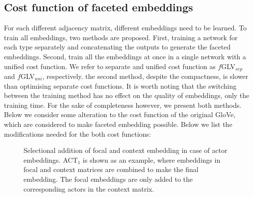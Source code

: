 \subsection{Cost function of faceted embeddings}
\label{sec:faceted_embeddings}
For each different adjacency matrix, different embeddings need to be learned. To train all embeddings, two methods are proposed. First, training a network for each type separately and concatenating the outputs to generate the faceted embeddings. Second, train all the embeddings at once in a single network with a unified cost function. We refer to separate and unified cost function as $f$GLV$_{sep}$ and $f$GLV$_{uni}$, respectively.  the second method, despite the compactness, is slower than optimising separate cost functions. It is worth noting that the switching between the training method has no effect on the quality of embeddings, only the training time. For the sake of completeness however, we present both methods. Below we consider some alteration to the cost function of the original GloVe, which are considered to make faceted embedding possible. Below we list the modifications needed for the both cost functions: 
\begin{figure}
{\small 
{} %

}
\caption{Selectional addition of focal and context embedding in case of actor embeddings. ACT$_1$ is shown as an example, where embeddings in focal and context matrices are combined to make the final embedding. The focal embeddings are only added to the corresponding actors in the context matrix.} \label{fig:focal_addition}
\end{figure}
